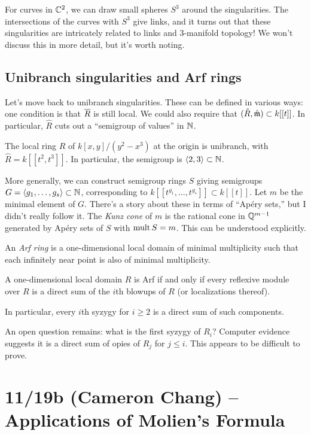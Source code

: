 \documentclass{amsart}
\begin{document}
For curves in $\mathbb{C}^2$, we can draw small spheres $S^3$ around the singularities.
The intersections of the curves with $S^3$ give links, and it turns out that these singularities are intricately related to links and 3-manifold topology!
We won't discuss this in more detail, but it's worth noting.

\subsection{Unibranch singularities and Arf rings}

Let's move back to unibranch singularities.
These can be defined in various ways: one condition is that $\overline{R}$ is still local.
We could also require that $(\hat{R}, \hat{\mathfrak{m}}) \subset k[[t]]$.
In particular, $\hat{R}$ cuts out a ``semigroup of values'' in $\mathbb{N}$.

\begin{ex}
	The local ring $R$ of $k[x, y] / (y^2 - x^3)$ at the origin is unibranch, with $\hat{R} = k[[t^2, t^3]]$.
	In particular, the semigroup is $\langle {2, 3} \rangle \subset \mathbb{N}$.
\end{ex}

More generally, we can construct semigroup rings $S$ giving semigroups $G = \langle {g_1, \dots, g_s} \rangle \subset \mathbb{N}$, corresponding to $k[[t^{g_1}, \dots, t^{g_s}]] \subset k[[t]]$.
Let $m$ be the minimal element of $G$.
There's a story about these in terms of ``Ap\'ery sets,'' but I didn't really follow it.
The \emph{Kunz cone} of $m$ is the rational cone in $\mathbb{Q}^{m-1}$ generated by Ap\'ery sets of $S$ with $\operatorname{mult} S = m$.
This can be understood explicitly.

An \emph{Arf ring} is a one-dimensional local domain of minimal multiplicity such that each infinitely near point is also of minimal multiplicity.

\begin{thm}
	A one-dimensional local domain $R$ is Arf if and only if every reflexive module over $R$ is a direct sum of the $i$th blowups of $R$ (or localizations thereof).
\end{thm}

In particular, every $i$th syzygy for $i \geq 2$ is a direct sum of such components.

An open question remains: what is the first syzygy of $R_i$?
Computer evidence suggests it is a direct sum of opies of $R_j$ for $j \leq i$.
This appears to be difficult to prove.

\section{11/19b (Cameron Chang) -- Applications of Molien's Formula}
\end{document}
